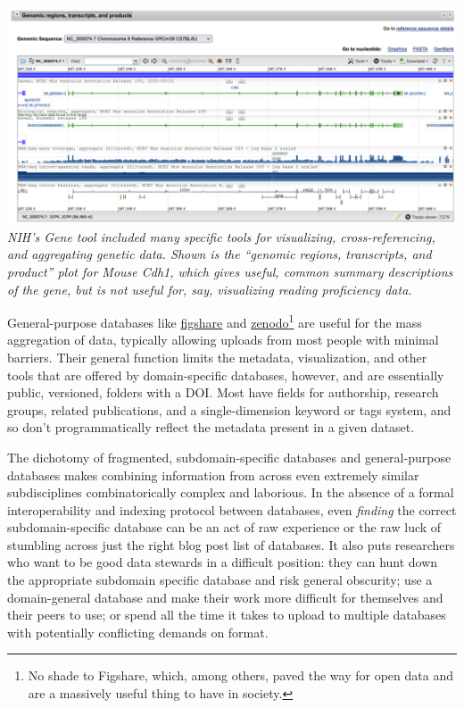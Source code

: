 \documentclass[11pt]{article}
\begin{document}
\begin{multicols}{2}
\includegraphics[width=\linewidth]{../assets/images/nih_gene_cdh1.png}
\emph{NIH's Gene tool included many specific tools for visualizing,
cross-referencing, and aggregating genetic data. Shown is the ``genomic
regions, transcripts, and product'' plot for Mouse Cdh1, which gives
useful, common summary descriptions of the gene, but is not useful for,
say, visualizing reading proficiency data.}

General-purpose databases like \href{https://figshare.com/}{figshare}
and \href{https://zenodo.org/}{zenodo}\footnote{No shade to Figshare,
  which, among others, paved the way for open data and are a massively
  useful thing to have in society.} are useful for the mass aggregation
of data, typically allowing uploads from most people with minimal
barriers. Their general function limits the metadata, visualization, and
other tools that are offered by domain-specific databases, however, and
are essentially public, versioned, folders with a DOI. Most have fields
for authorship, research groups, related publications, and a
single-dimension keyword or tags system, and so don't programmatically
reflect the metadata present in a given dataset.

The dichotomy of fragmented, subdomain-specific databases and
general-purpose databases makes combining information from across even
extremely similar subdisciplines combinatorically complex and laborious.
In the absence of a formal interoperability and indexing protocol
between databases, even \emph{finding} the correct subdomain-specific
database can be an act of raw experience or the raw luck of stumbling
across just the right blog post list of databases. It also puts
researchers who want to be good data stewards in a difficult position:
they can hunt down the appropriate subdomain specific database and risk
general obscurity; use a domain-general database and make their work
more difficult for themselves and their peers to use; or spend all the
time it takes to upload to multiple databases with potentially
conflicting demands on format.


\end{multicols}
\end{document}
